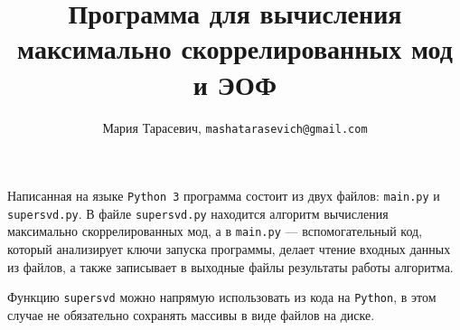 \documentclass[12pt, a4paper]{article}
\title{\large Программа для вычисления максимально скоррелированных мод и ЭОФ}
\author{Мария Тарасевич, \texttt{mashatarasevich@gmail.com}}
\date{}
\begin{document}
\maketitle
	
	
Написанная на языке \texttt{Python 3} программа состоит из двух файлов: \texttt{main.py} и \texttt{supersvd.py}. В файле \texttt{supersvd.py} находится алгоритм вычисления максимально скоррелированных мод, а в \texttt{main.py} --- вспомогательный код, который анализирует ключи запуска программы, делает чтение входных данных из файлов, а также записывает в выходные файлы результаты работы алгоритма.

Функцию \texttt{supersvd} можно напрямую использовать из кода на \texttt{Python}, в этом случае не обязательно сохранять массивы в виде файлов на диске. 
 



\end{document}
